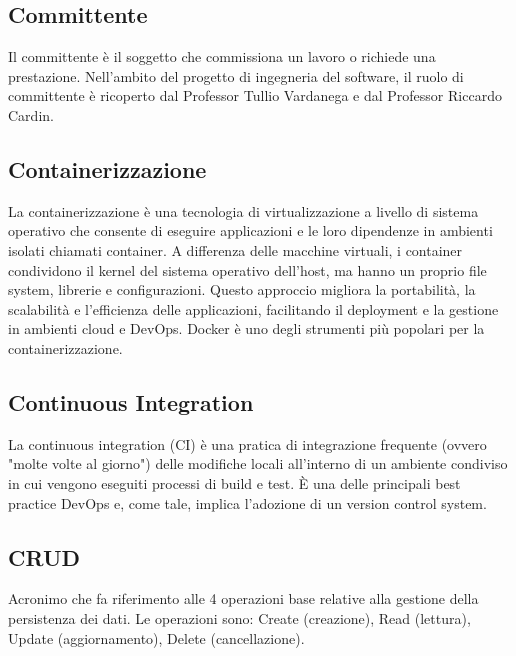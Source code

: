 \vspace{2em}
\subsection*{Committente}
\par Il committente è il soggetto che commissiona un lavoro o richiede una prestazione. Nell'ambito del progetto di ingegneria del software, il ruolo di committente è ricoperto dal Professor Tullio Vardanega e dal Professor Riccardo Cardin.

\vspace{2em}
\subsection*{Containerizzazione}
\par La containerizzazione è una tecnologia di virtualizzazione a livello di sistema operativo che consente di eseguire applicazioni e le loro dipendenze in ambienti isolati chiamati container. A differenza delle macchine virtuali, i container condividono il kernel del sistema operativo dell'host, ma hanno un proprio file system, librerie e configurazioni. Questo approccio migliora la portabilità, la scalabilità e l'efficienza delle applicazioni, facilitando il deployment e la gestione in ambienti cloud e DevOps. Docker è uno degli strumenti più popolari per la containerizzazione.

\vspace{2em}
\subsection*{Continuous Integration}
\par La continuous integration (CI) è una pratica di integrazione frequente (ovvero "molte volte al giorno") delle modifiche locali all'interno di un ambiente condiviso in cui vengono eseguiti processi di build e test. È una delle principali best practice DevOps e, come tale, implica l'adozione di un version control system.

\vspace{2em}
\subsection*{CRUD}
\par Acronimo che fa riferimento alle 4 operazioni base relative alla gestione della persistenza dei dati. Le operazioni sono: Create (creazione), Read (lettura), Update (aggiornamento), Delete (cancellazione).

